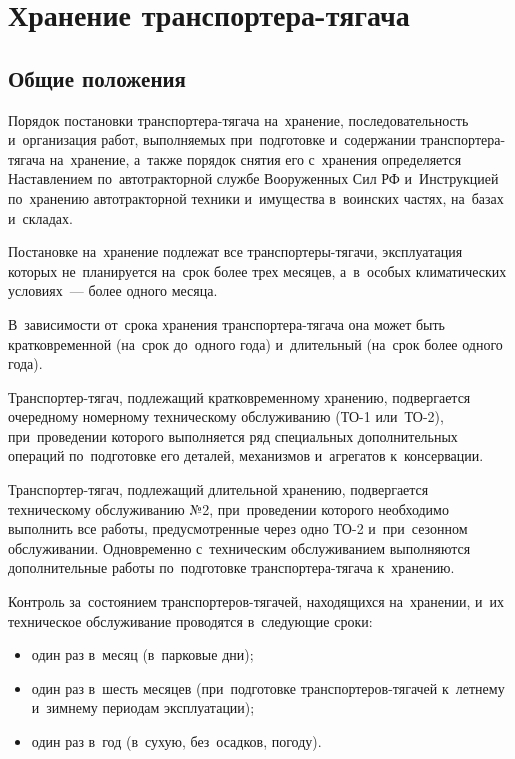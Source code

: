 \chapter{Хранение транспортера-тягача}
\section{Общие положения}

Порядок постановки транспортера-тягача на~хранение, последовательность и~организация работ, выполняемых при~подготовке и~содержании транспортера-тягача на~хранение, а~также порядок снятия его с~хранения определяется Наставлением по~автотракторной службе Вооруженных Сил РФ и~Инструкцией по~хранению автотракторной техники и~имущества в~воинских частях, на~базах и~складах. 

Постановке на~хранение подлежат все транспортеры-тягачи, эксплуатация которых не~планируется на~срок более трех месяцев, а~в~особых климатических условиях~--- более одного месяца. 

В~зависимости от~срока хранения транспортера-тягача она может быть кратковременной (на~срок до~одного года) и~длительный (на~срок более одного года). 

Транспортер-тягач, подлежащий кратковременному хранению, подвергается очередному номерному техническому обслуживанию (ТО-1 или~ТО-2), при~проведении которого выполняется ряд специальных дополнительных операций по~подготовке его деталей, механизмов и~агрегатов к~консервации. 

Транспортер-тягач, подлежащий длительной хранению, подвергается техническому обслуживанию №2, при~проведении которого необходимо выполнить все работы, предусмотренные через одно ТО-2 и~при~сезонном обслуживании. Одновременно с~техническим обслуживанием выполняются дополнительные работы по~подготовке транспортера-тягача к~хранению. 

Контроль за~состоянием транспортеров-тягачей, находящихся на~хранении, и~их техническое обслуживание проводятся в~следующие сроки: 
\begin{itemize}
    \item один раз в~месяц (в~парковые дни);
    \item один раз в~шесть месяцев (при~подготовке транспортеров-тягачей к~летнему и~зимнему периодам эксплуатации); 
    \item один раз в~год (в~сухую, без~осадков, погоду).
\end{itemize}


